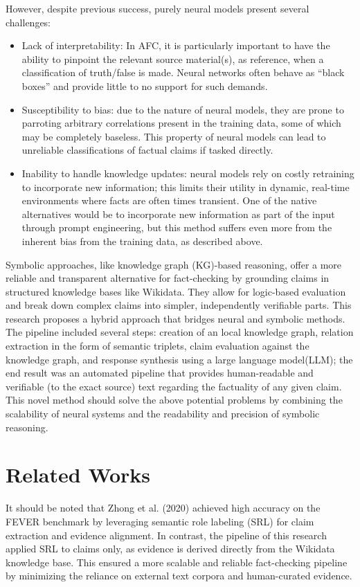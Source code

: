 \documentclass[11pt]{article}
\begin{document}
However, despite previous success, purely neural models present several challenges:
\begin{itemize}
    \item Lack of interpretability: In AFC, it is particularly important to have the ability to pinpoint the relevant source material(s), as reference, when a classification of truth/false is made. Neural networks often behave as “black boxes” and provide little to no support for such demands. 
    \item Susceptibility to bias: due to the nature of neural models, they are prone to parroting arbitrary correlations present in the training data, some of which may be completely baseless. This property of neural models can lead to unreliable classifications of factual claims if tasked directly. 
    \item Inability to handle knowledge updates: neural models rely on costly retraining to incorporate new information; this limits their utility in dynamic, real-time environments where facts are often times transient. One of the native alternatives would be to incorporate new information as part of the input through prompt engineering, but this method suffers even more from the inherent bias from the training data, as described above. 
\end{itemize}

Symbolic approaches, like knowledge graph (KG)-based reasoning, offer a more reliable and transparent alternative for fact-checking by grounding claims in structured knowledge bases like Wikidata. They allow for logic-based evaluation and break down complex claims into simpler, independently verifiable parts.
This research proposes a hybrid approach that bridges neural and symbolic methods. The pipeline included several steps: creation of an local knowledge graph, relation extraction in the form of semantic triplets, claim evaluation against the knowledge graph, and response synthesis using a large language model(LLM); the end result was an automated pipeline that provides human-readable and verifiable (to the exact source) text regarding the factuality of any given claim. This novel method should solve the above potential problems by combining the scalability of neural systems and the readability and precision of symbolic reasoning. 

\section{Related Works}
It should be noted that Zhong et al. (2020)\cite{zhong} achieved high accuracy on the FEVER benchmark by leveraging semantic role labeling (SRL) for claim extraction and evidence alignment. In contrast, the pipeline of this research applied SRL to claims only, as evidence is derived directly from the Wikidata knowledge base. This ensured a more scalable and reliable fact-checking pipeline by minimizing the reliance on external text corpora and human-curated evidence.
\end{document}
